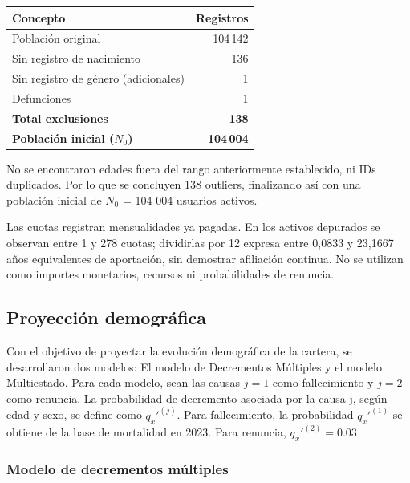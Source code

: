 \documentclass[11pt]{article}
\begin{document}
\begin{table}[htbp]
\centering
\begin{tabular}{lr}
\hline
\textbf{Concepto} & \textbf{Registros} \\
\hline
Población original & 104\,142 \\
Sin registro de nacimiento & 136 \\
Sin registro de género (adicionales) & 1 \\
Defunciones & 1 \\
\hline
\textbf{Total exclusiones} & \textbf{138} \\
\textbf{Población inicial ($N_0$)} & \textbf{104\,004} \\
\hline
\end{tabular}
\end{table}

No se encontraron edades fuera del rango anteriormente establecido, ni IDs duplicados. Por lo que se concluyen 138  outliers, finalizando así con una población inicial de $N_0$ = 104 004 usuarios activos.

Las cuotas registran mensualidades ya pagadas. En los activos depurados se observan entre 1 y 278 cuotas; dividirlas por 12 expresa entre 0,0833 y 23,1667 años equivalentes de aportación, sin demostrar afiliación continua. No se utilizan como importes monetarios, recursos ni probabilidades de renuncia.

\vspace{-0.6cm}

\subsection{Proyección demográfica}

\vspace{-0.6cm}

Con el objetivo de proyectar la evolución demográfica de la cartera, se desarrollaron dos modelos: El modelo de Decrementos Múltiples y el modelo Multiestado. Para cada modelo, sean las causas $j = 1$ como fallecimiento y $j = 2$ como renuncia. La probabilidad de decremento asociada por la causa j, según edad y sexo, se define como $q_x'^{(j)}$. Para fallecimiento, la probabilidad $q_x'^{(1)}$ se obtiene de la base de mortalidad en 2023. Para renuncia, $q_x'^{(2)}=0.03$

\vspace{-0.6cm}

\subsubsection*{Modelo de decrementos múltiples}
\end{document}
